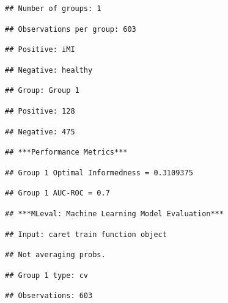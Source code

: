 \documentclass[
]{article}
\begin{document}
\begin{verbatim}
## Number of groups: 1
\end{verbatim}

\begin{verbatim}
## Observations per group: 603
\end{verbatim}

\begin{verbatim}
## Positive: iMI
\end{verbatim}

\begin{verbatim}
## Negative: healthy
\end{verbatim}

\begin{verbatim}
## Group: Group 1
\end{verbatim}

\begin{verbatim}
## Positive: 128
\end{verbatim}

\begin{verbatim}
## Negative: 475
\end{verbatim}

\begin{verbatim}
## ***Performance Metrics***
\end{verbatim}

\begin{verbatim}
## Group 1 Optimal Informedness = 0.3109375
\end{verbatim}

\begin{verbatim}
## Group 1 AUC-ROC = 0.7
\end{verbatim}

\begin{verbatim}
## ***MLeval: Machine Learning Model Evaluation***
\end{verbatim}

\begin{verbatim}
## Input: caret train function object
\end{verbatim}

\begin{verbatim}
## Not averaging probs.
\end{verbatim}

\begin{verbatim}
## Group 1 type: cv
\end{verbatim}

\begin{verbatim}
## Observations: 603
\end{verbatim}
\end{document}
